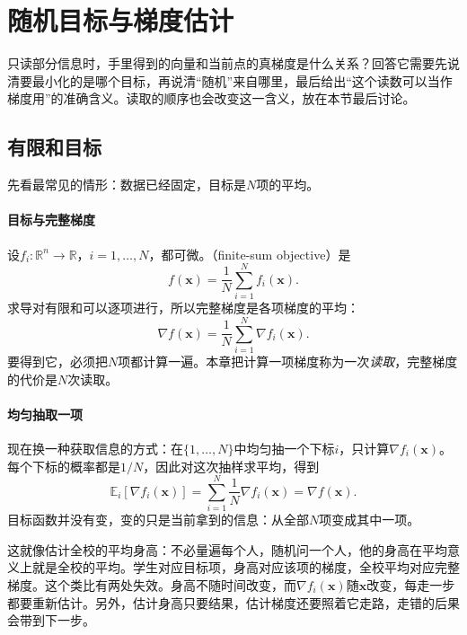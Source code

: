\section{随机目标与梯度估计}
\label{sec:sgd-objectives}

只读部分信息时，手里得到的向量和当前点的真梯度是什么关系？回答它需要先说清要最小化的是哪个目标，再说清“随机”来自哪里，最后给出“这个读数可以当作梯度用”的准确含义。读取的顺序也会改变这一含义，放在本节最后讨论。

\subsection{有限和目标}
\label{sec:sgd-finite-sum}

先看最常见的情形：数据已经固定，目标是$N$项的平均。

\paragraph{目标与完整梯度}
设$f_i:\mathbb{R}^n\to\mathbb{R}$，$i=1,\ldots,N$，都可微。（finite-sum objective）是
\begin{equation}
 f(\bm{x})=\frac{1}{N}\sum_{i=1}^{N}f_i(\bm{x}).
 \label{eq:sgd-finite-sum}
\end{equation}
求导对有限和可以逐项进行，所以完整梯度是各项梯度的平均：
\begin{equation}
 \nabla f(\bm{x})=\frac{1}{N}\sum_{i=1}^{N}\nabla f_i(\bm{x}).
 \label{eq:sgd-full-gradient}
\end{equation}
要得到它，必须把$N$项都计算一遍。本章把计算一项梯度称为一次\emph{读取}，完整梯度的代价是$N$次读取。

\paragraph{均匀抽取一项}
现在换一种获取信息的方式：在$\{1,\ldots,N\}$中均匀抽一个下标$i$，只计算$\nabla f_i(\bm{x})$。每个下标的概率都是$1/N$，因此对这次抽样求平均，得到
\begin{equation}
 \mathbb{E}_i[\nabla f_i(\bm{x})]=\sum_{i=1}^{N}\frac{1}{N}\nabla f_i(\bm{x})=\nabla f(\bm{x}).
 \label{eq:sgd-uniform-mean}
\end{equation}
目标函数并没有变，变的只是当前拿到的信息：从全部$N$项变成其中一项。

这就像估计全校的平均身高：不必量遍每个人，随机问一个人，他的身高在平均意义上就是全校的平均。学生对应目标项，身高对应该项的梯度，全校平均对应完整梯度。这个类比有两处失效。身高不随时间改变，而$\nabla f_i(\bm{x})$随$\bm{x}$改变，每走一步都要重新估计。另外，估计身高只要结果，估计梯度还要照着它走路，走错的后果会带到下一步。

